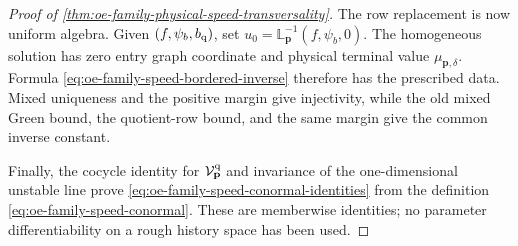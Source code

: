 \begin{proof}[Proof of
\cref{thm:oe-family-physical-speed-transversality}]
The row replacement is now uniform algebra.  Given
\((f,\psi_b,b_{\rm q})\), set
\(u_0=\mathbb L_{\mathbf p}^{-1}(f,\psi_b,0)\).
The homogeneous solution has zero entry graph coordinate and physical
terminal value \(\mu_{\mathbf p,\delta}\).  Formula
\cref{eq:oe-family-speed-bordered-inverse} therefore has the prescribed
data.  Mixed uniqueness and the positive margin give injectivity, while
the old mixed Green bound, the quotient-row bound, and the same margin
give the common inverse constant.

Finally, the cocycle identity for
\(\mathcal V_{\mathbf p}^{\rm q}\) and invariance of the one-dimensional
unstable line prove
\cref{eq:oe-family-speed-conormal-identities} from the definition
\cref{eq:oe-family-speed-conormal}.  These are memberwise identities;
no parameter differentiability on a rough history space has been used.
\end{proof}

